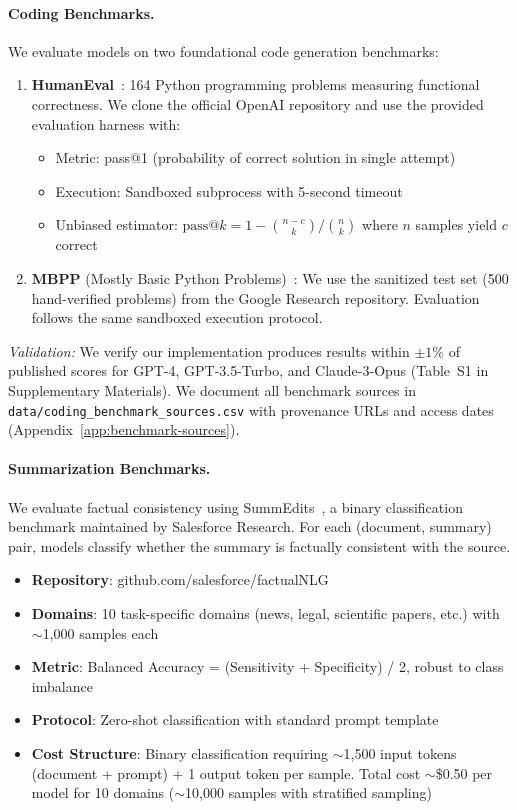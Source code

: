 \paragraph{Coding Benchmarks.}
We evaluate models on two foundational code generation benchmarks:

\begin{enumerate}[nosep]
\item \textbf{HumanEval}~\cite{chen2021humaneval}: 164 Python programming problems measuring functional correctness. We clone the official OpenAI repository and use the provided evaluation harness with:
\begin{itemize}[nosep]
    \item Metric: pass@1 (probability of correct solution in single attempt)
    \item Execution: Sandboxed subprocess with 5-second timeout
    \item Unbiased estimator: $\text{pass}@k = 1 - \binom{n-c}{k}/\binom{n}{k}$ where $n$ samples yield $c$ correct~\cite{chen2021humaneval}
\end{itemize}

\item \textbf{MBPP} (Mostly Basic Python Problems)~\cite{austin2021mbpp}: We use the sanitized test set (500 hand-verified problems) from the Google Research repository. Evaluation follows the same sandboxed execution protocol.
\end{enumerate}

\textit{Validation:} We verify our implementation produces results within $\pm1\%$ of published scores for GPT-4, GPT-3.5-Turbo, and Claude-3-Opus (Table~S1 in Supplementary Materials). We document all benchmark sources in \texttt{data/coding\_benchmark\_sources.csv} with provenance URLs and access dates (Appendix~\ref{app:benchmark-sources}).

\paragraph{Summarization Benchmarks.}
We evaluate factual consistency using SummEdits~\cite{tang2023summedits}, a binary classification benchmark maintained by Salesforce Research. For each (document, summary) pair, models classify whether the summary is factually consistent with the source.
%
\begin{itemize}[nosep]
    \item \textbf{Repository}: github.com/salesforce/factualNLG
    \item \textbf{Domains}: 10 task-specific domains (news, legal, scientific papers, etc.) with $\sim$1,000 samples each
    \item \textbf{Metric}: Balanced Accuracy = (Sensitivity + Specificity) / 2, robust to class imbalance
    \item \textbf{Protocol}: Zero-shot classification with standard prompt template
    \item \textbf{Cost Structure}: Binary classification requiring $\sim$1,500 input tokens (document + prompt) + 1 output token per sample. Total cost $\sim$\$0.50 per model for 10 domains ($\sim$10,000 samples with stratified sampling)
\end{itemize}

